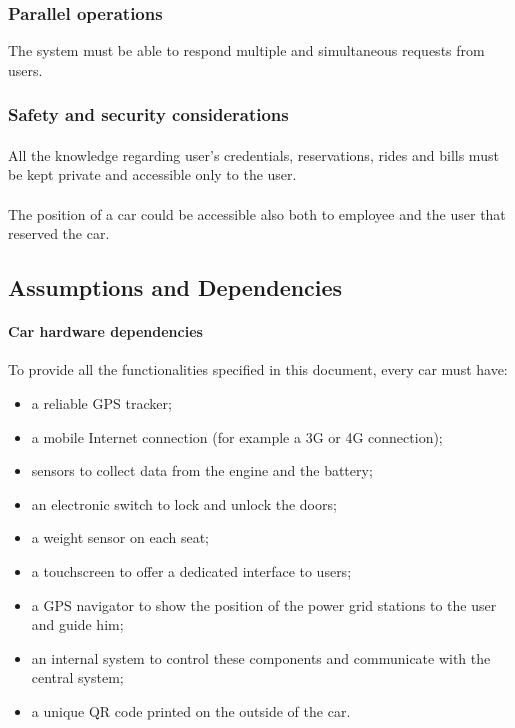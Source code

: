 \documentclass[english]{article}
\begin{document}
\subsubsection{Parallel operations}
The system must be able to respond multiple and simultaneous requests from users.

\subsubsection{Safety and security considerations}
\paragraph{}
All the knowledge regarding user's credentials, reservations, rides and bills must be kept private and accessible only to the user.

\paragraph{}
The position of a car could be accessible also both to employee and the user that reserved the car.


\newpage
\subsection{Assumptions and Dependencies}

\paragraph{Car hardware dependencies}
To provide all the functionalities specified in this document, every car must have:
\begin{itemize}
	\item{a reliable GPS tracker;}
	\item{a mobile Internet connection (for example a 3G or 4G connection);}
	\item{sensors to collect data from the engine and the battery;}
	\item{an electronic switch to lock and unlock the doors;}
	\item{a weight sensor on each seat;}
	\item{a touchscreen to offer a dedicated interface to users;}
	\item{a GPS navigator to show the position of the power grid stations to the user and guide him;}
	\item{an internal system to control these components and communicate with the central system;}
	\item{a unique QR code printed on the outside of the car.}
\end{itemize}
\end{document}
